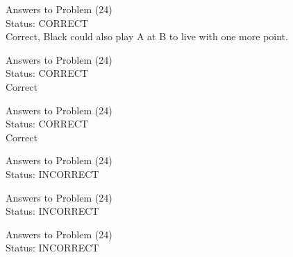 \documentclass[11pt]{article}
\begin{document}
\begin{minipage}[t]{0.5\textwidth}
  {\centering
  
  Answers to Problem (24)\\
  Status: CORRECT\\
  Correct, Black could also play A at B to live with one more point.\\
  }
\end{minipage}
\begin{minipage}[t]{0.5\textwidth}
  {\centering
  
  Answers to Problem (24)\\
  Status: CORRECT\\
  Correct\\
  }
\end{minipage}
\begin{minipage}[t]{0.5\textwidth}
  {\centering
  
  Answers to Problem (24)\\
  Status: CORRECT\\
  Correct\\
  }
\end{minipage}
\begin{minipage}[t]{0.5\textwidth}
  {\centering
  
  Answers to Problem (24)\\
  Status: INCORRECT\\
  
  }
\end{minipage}
\begin{minipage}[t]{0.5\textwidth}
  {\centering
  
  Answers to Problem (24)\\
  Status: INCORRECT\\
  
  }
\end{minipage}
\begin{minipage}[t]{0.5\textwidth}
  {\centering
  
  Answers to Problem (24)\\
  Status: INCORRECT\\
  
  }
\end{minipage}
\end{document}
